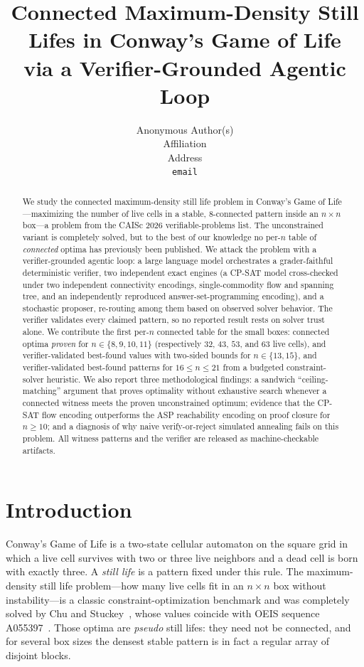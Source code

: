 \documentclass{article}
\title{Connected Maximum-Density Still Lifes in Conway's Game of Life\\via a Verifier-Grounded Agentic Loop}
\author{%
  Anonymous Author(s) \\
  Affiliation \\
  Address \\
  \texttt{email} \\
}
\begin{document}
\maketitle

\begin{abstract}
We study the connected maximum-density still life problem in Conway's Game of Life---maximizing the number of live cells in a stable, $8$-connected pattern inside an $n\times n$ box---a problem from the CAISc 2026 verifiable-problems list. The unconstrained variant is completely solved, but to the best of our knowledge no per-$n$ table of \emph{connected} optima has previously been published. We attack the problem with a verifier-grounded agentic loop: a large language model orchestrates a grader-faithful deterministic verifier, two independent exact engines (a CP-SAT model cross-checked under two independent connectivity encodings, single-commodity flow and spanning tree, and an independently reproduced answer-set-programming encoding), and a stochastic proposer, re-routing among them based on observed solver behavior. The verifier validates every claimed pattern, so no reported result rests on solver trust alone. We contribute the first per-$n$ connected table for the small boxes: connected optima \emph{proven} for $n\in\{8,9,10,11\}$ (respectively $32$, $43$, $53$, and $63$ live cells), and verifier-validated best-found values with two-sided bounds for $n\in\{13,15\}$, and verifier-validated best-found patterns for $16\le n\le 21$ from a budgeted constraint-solver heuristic. We also report three methodological findings: a sandwich ``ceiling-matching'' argument that proves optimality without exhaustive search whenever a connected witness meets the proven unconstrained optimum; evidence that the CP-SAT flow encoding outperforms the ASP reachability encoding on proof closure for $n\ge 10$; and a diagnosis of why naive verify-or-reject simulated annealing fails on this problem. All witness patterns and the verifier are released as machine-checkable artifacts.
\end{abstract}

\section{Introduction}
\label{sec:intro}

Conway's Game of Life is a two-state cellular automaton on the square grid in which a live cell survives with two or three live neighbors and a dead cell is born with exactly three. A \emph{still life} is a pattern fixed under this rule. The maximum-density still life problem---how many live cells fit in an $n\times n$ box without instability---is a classic constraint-optimization benchmark and was completely solved by Chu and Stuckey~\citep{chu2012}, whose values coincide with OEIS sequence A055397~\citep{oeis}. Those optima are \emph{pseudo} still lifes: they need not be connected, and for several box sizes the densest stable pattern is in fact a regular array of disjoint blocks.
\end{document}
